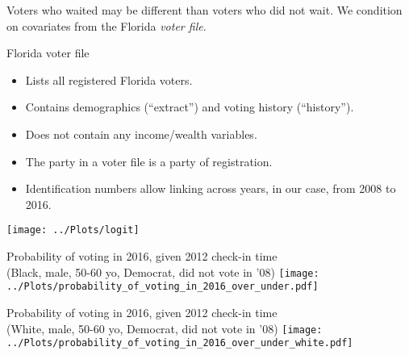 \documentclass{beamer}
\begin{document}
		\begin{frame}
                  Voters who waited may be different than voters who
                  did not wait.  We condition on covariates from the
                  Florida \emph{voter file}.
		\end{frame}

		\begin{frame}
                  Florida voter file
                  \begin{itemize}
                    \item <2-> Lists all registered Florida voters.
                    \item <3-> Contains demographics (``extract'') and
                      voting history (``history'').
                    \item <4-> Does not contain any income/wealth
                      variables.
                    \item <5-> The party in a voter file is a party of
                      registration.
                    \item <6-> Identification numbers allow linking
                      across years, in our case, from 2008 to 2016.
                    \end{itemize}
                  \end{frame}


	
		\begin{frame}
		\centering 
		\texttt{[image: ../Plots/logit]}			
		\end{frame}

		\begin{frame}				
			\centering
			Probability of voting in 2016, given 2012 check-in time \\
			(Black, male, 50-60 yo, Democrat, did not vote in '08)
			\texttt{[image: ../Plots/probability\_of\_voting\_in\_2016\_over\_under.pdf]}
		\end{frame}
		
		
		\begin{frame}				
                  \centering
			Probability of voting in 2016, given 2012 check-in time \\
			(White, male, 50-60 yo, Democrat, did not vote in '08)
			\texttt{[image: ../Plots/probability\_of\_voting\_in\_2016\_over\_under\_white.pdf]}
                      \end{frame}
                
\end{document}

